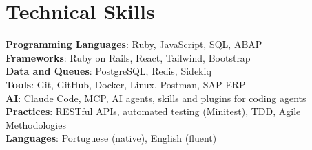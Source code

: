 \documentclass[letterpaper,11pt]{article}
\begin{document}
\section{Technical Skills}
 \begin{itemize}[leftmargin=0.15in, label={}]
    \small{\item{
     \textbf{Programming Languages}{: Ruby, JavaScript, SQL, ABAP} \\
     \textbf{Frameworks}{: Ruby on Rails, React, Tailwind, Bootstrap} \\
     \textbf{Data and Queues}{: PostgreSQL, Redis, Sidekiq} \\
     \textbf{Tools}{: Git, GitHub, Docker, Linux, Postman, SAP ERP} \\
     \textbf{AI}{: Claude Code, MCP, AI agents, skills and plugins for coding agents} \\
     \textbf{Practices}{: RESTful APIs, automated testing (Minitest), TDD, Agile Methodologies} \\
     \textbf{Languages}{: Portuguese (native), English (fluent)}
    }}
 \end{itemize}
\end{document}

